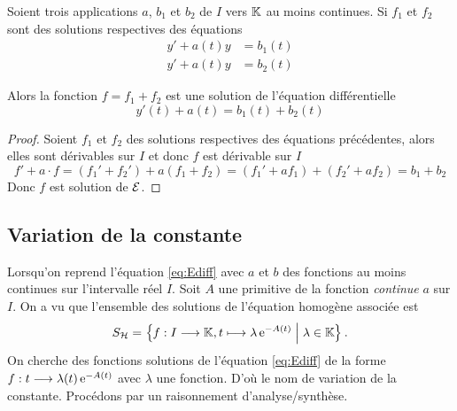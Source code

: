 \begin{prop}
  Soient trois applications \(a\), \(b_1\) et \(b_2\) de \(I\) vers \(\mathbb{K}\) au 
  moins continues. Si \(f_1\) et \(f_2\) sont des solutions respectives des 
  équations    
  \begin{align}
    y' + a(t)y& = b_1(t)\\ 
    y' + a(t)y& = b_2(t)
  \end{align}

  Alors la fonction \(f = f_1 + f_2\) est une solution de l'équation différentielle 
  \begin{equation}
    y'(t) + a(t) = b_1(t) + b_2(t)
  \end{equation}
\end{prop}
\begin{proof}
  Soient \(f_1\) et \(f_2\) des solutions respectives des équations 
  précédentes, alors elles sont dérivables sur \(I\) et donc \(f\) est 
  dérivable sur \(I\)
  \begin{equation}
    f' + a \cdot f = (f_1' + f_2') + a(f_1 + f_2) = (f_1' + af_1) + (f_2' + 
    af_2) = b_1 + b_2
  \end{equation}
  Donc \(f\) est solution de \(\mathcal{E}\).
\end{proof}

\subsection{Variation de la constante}
\label{subsec:variationdelaconstante}

Lorsqu'on reprend l'équation \eqref{eq:Ediff} avec \(a\) et \(b\) des 
fonctions au moins continues sur l'intervalle réel \(I\). Soit \(A\) une 
primitive de la fonction \emph{continue} \(a\) sur \(I\). On a vu que 
l'ensemble des solutions de l'équation homogène associée est
\begin{equation}
  S_{\mathcal{H}} = \left\{f:I \longrightarrow{} \mathbb{K}, t \longmapsto{} \lambda \operatorname{e}^{-A(t)}\mathrel{}\middle|\mathrel{}\lambda \in 
  \mathbb{K}\right\}.
\end{equation}
On cherche des fonctions solutions de l'équation \eqref{eq:Ediff} de la 
forme \(f:t \longrightarrow{} \lambda(t)\operatorname{e}^{-A(t)}\) avec \(\lambda\) une 
fonction. D'où le nom de variation de la constante. Procédons par un 
raisonnement d'analyse/synthèse.

